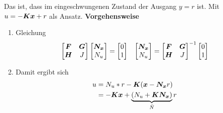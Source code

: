 \begin{tcolorbox}[colback=white!10!white,colframe=green!30!black,title=Referenzsystem] 
Das ist, dass im eingeschwungenen Zustand der Ausgang $y = r$ ist. Mit $u = -\boldsymbol{Kx}+r$ als Ansatz.
\tcblower
\textbf{Vorgehensweise}
\begin{enumerate}
    \item Gleichung \begin{align*}
        \begin{bmatrix}
        \boldsymbol{F} &\boldsymbol{G}\\ \boldsymbol{H} & J
        \end{bmatrix}\begin{bmatrix}
        \boldsymbol{N_x}\\N_u
        \end{bmatrix} = \begin{bmatrix}
            0\\1
        \end{bmatrix} && \begin{bmatrix}
        \boldsymbol{N_x}\\N_u
        \end{bmatrix} = 
        \begin{bmatrix}
        \boldsymbol{F} &\boldsymbol{G}\\ \boldsymbol{H} & J
        \end{bmatrix}^{-1} \begin{bmatrix}
        0\\1
        \end{bmatrix}
    \end{align*}
    \item Damit ergibt sich \begin{align*}
    u &= N_u  *r-\boldsymbol{K}(\boldsymbol{x}-\boldsymbol{N_x}r)\\
    &= -\boldsymbol{Kx}+\underbrace{(N_u+\boldsymbol{KN_x})}_{\bar{N}}r
    \end{align*}
\end{enumerate}
\end{tcolorbox}

